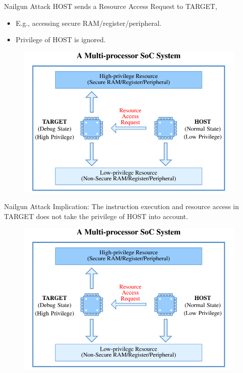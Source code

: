 \documentclass{beamer}
\begin{document}
\begin{frame}{Nailgun Attack}
    HOST sends a Resource Access Request to TARGET,
    \begin{itemize}
        \item E.g., accessing secure RAM/register/peripheral.
        \item Privilege of HOST is ignored.
    \end{itemize}
    \begin{figure}
        \centering
        \includegraphics[scale=.40]{SUSTech-Beamer-Theme/pic/Nailgun9.png}
        \label{fig:my_label}
    \end{figure}
\end{frame}

\begin{frame}{Nailgun Attack}
    Implication: The instruction execution and resource access in TARGET does not take the privilege of HOST into account.
    \begin{figure}
        \centering
        \includegraphics[scale=.40]{SUSTech-Beamer-Theme/pic/Nailgun9.png}
        \label{fig:my_label}
    \end{figure}
\end{frame}
\end{document}

